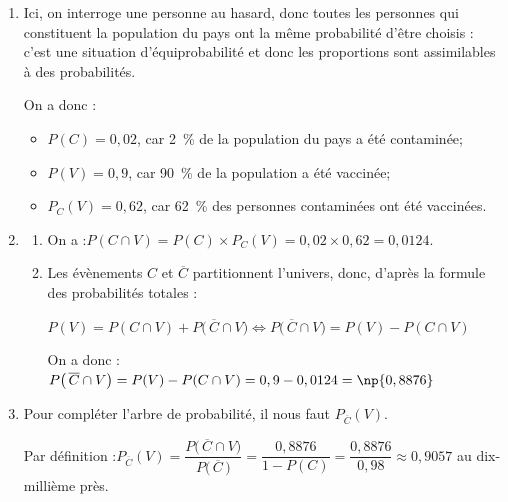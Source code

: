 
\medskip

\begin{enumerate}
\item Ici, on interroge une personne au hasard, donc toutes les personnes qui constituent la population du pays ont la même probabilité d'être choisis : c'est une situation d'équiprobabilité et donc les proportions sont assimilables à des probabilités.

On a donc :
\begin{itemize}
\item $P(C) = 0,02$, car 2~\% de la population du pays a été contaminée;
\item $P(V) = 0,9$, car 90~\% de la population a été vaccinée;
\item $P_C(V) = 0,62$, car 62~\% des personnes contaminées ont été vaccinées.
\end{itemize}

\item 
	\begin{enumerate}
		\item On a :\quad $P(C \cap V) = P(C) \times P_C(V) = 0,02 \times 0,62 = 0,0124$.
		\item Les évènements $C$ et $\overline{C}$ partitionnent l'univers, donc, d'après la formule des probabilités totales :

$P(V) = P(C \cap V) + P\big(\,\overline{C}\cap V\big) \iff P\big(\,\overline{C} \cap V\big) = P(V) -
 P(C \cap V)$

On a donc : \quad $P\big(\,\overline{C} \cap V\big) = P(V) - P(C \cap V) = 0,9 - 0,0124 = \np{0,8876}$
	\end{enumerate}
\item Pour compléter l'arbre de probabilité, il nous faut $P_{\overline{C}}(V)$.

Par définition :\quad $P_{\overline{C}}(V) = \dfrac{P\big(\,\overline{C} \cap V\big)}{P\big(\,\overline{C}\,\big)} = \dfrac{0,8876}{1 - P(C)}=\dfrac{0,8876}{0,98} \approx 0,9057$ au dix-millième près.


\end{enumerate}
